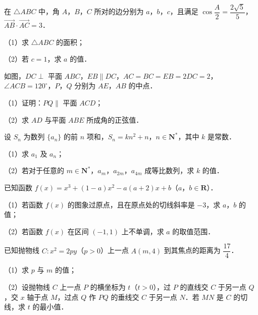\begin{question}
在 $\triangle ABC$ 中，角 $A$，$B$，$C$ 所对的边分别为 $a$，$b$，$c$，且满足 $\cos\dfrac A2=\dfrac{2\sqrt5}{5}$，$\overrightarrow{AB}\cdot\overrightarrow{AC}=3$．

（1）求 $\triangle ABC$ 的面积；

（2）若 $c=1$，求 $a$ 的值．

\Needspace{0.4\textheight}
\end{question}
\begingroup
\renewenvironment{question}{\Needspace{0.5\textheight}}{}
\begin{question}
如图，$DC\perp$ 平面 $ABC$，$EB\parallel DC$，$AC=BC=EB=2DC=2$，$\angle ACB=120^\circ$，$P$，$Q$ 分别为 $AE$，$AB$ 的中点．

（1）证明：$PQ\parallel$ 平面 $ACD$；

（2）求 $AD$ 与平面 $ABE$ 所成角的正弦值．
\nopagebreak[4]
\begin{center}\end{center}
\nopagebreak[4]
\end{question}
\endgroup
\begin{question}
设 $S_n$ 为数列 $\{a_n\}$ 的前 $n$ 项和，$S_n=kn^2+n$，$n\in\mathbf N^*$，其中 $k$ 是常数．

（1）求 $a_1$ 及 $a_n$；

（2）若对于任意的 $m\in\mathbf N^*$，$a_m$，$a_{2m}$，$a_{4m}$ 成等比数列，求 $k$ 的值．

\end{question}
\begin{question}
已知函数 $f(x)=x^3+(1-a)x^2-a(a+2)x+b$（$a$，$b\in\mathbf R$）．

（1）若函数 $f(x)$ 的图象过原点，且在原点处的切线斜率是 $-3$，求 $a$，$b$ 的值；

（2）若函数 $f(x)$ 在区间 $(-1,1)$ 上不单调，求 $a$ 的取值范围．

\Needspace{0.4\textheight}
\end{question}
\begingroup
\renewenvironment{question}{\Needspace{0.5\textheight}}{}
\begin{question}
已知抛物线 $C:x^2=2py$（$p>0$）上一点 $A(m,4)$ 到其焦点的距离为 $\dfrac{17}{4}$．

（1）求 $p$ 与 $m$ 的值；

（2）设抛物线 $C$ 上一点 $P$ 的横坐标为 $t$（$t>0$），过 $P$ 的直线交 $C$ 于另一点 $Q$，交 $x$ 轴于点 $M$，过点 $Q$ 作 $PQ$ 的垂线交 $C$ 于另一点 $N$．若 $MN$ 是 $C$ 的切线，求 $t$ 的最小值．
\nopagebreak[4]
\begin{center}\end{center}
\nopagebreak[4]

\end{question}
\endgroup